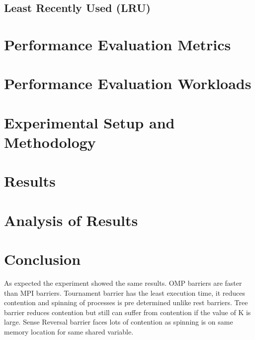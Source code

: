 \documentclass[11pt,pdftex,twocolumn]{article}
\begin{document}
\subsection{Least Recently Used (LRU)}
\lipsum

\section{Performance Evaluation Metrics}
\label{sec:perfMetrics}
\lipsum

\section{Performance Evaluation Workloads}
\label{sec:perfWork}
\lipsum

\section{Experimental Setup and Methodology}
\label{sec:exp}
\lipsum

\section{Results}
\label{sec:results}
\lipsum

\section{Analysis of Results}
\label{sec:analysis}
\lipsum

\section{Conclusion}
As expected the experiment showed the same results. OMP barriers are faster than MPI barriers. Tournament barrier has the least execution time, it reduces contention and spinning of processes is pre determined unlike rest barriers. Tree barrier reduces contention but still can suffer from contention if the value of K is large. Sense Reversal barrier faces lots of contention as spinning is on same memory location for same shared variable.
\end{document}
